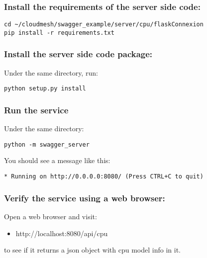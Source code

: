 \subsubsection{Install the requirements of the server side
code:}\label{install-the-requirements-of-the-server-side-code}

\begin{lstlisting}
cd ~/cloudmesh/swagger_example/server/cpu/flaskConnexion
pip install -r requirements.txt
\end{lstlisting}

\subsubsection{Install the server side code
package:}\label{install-the-server-side-code-package}

Under the same directory, run:

\begin{lstlisting}
python setup.py install
\end{lstlisting}

\subsubsection{Run the service}\label{run-the-service}

Under the same directory:

\begin{lstlisting}
python -m swagger_server
\end{lstlisting}

You should see a message like this:

\begin{lstlisting}
* Running on http://0.0.0.0:8080/ (Press CTRL+C to quit)
\end{lstlisting}

\subsubsection{Verify the service using a web
browser:}\label{verify-the-service-using-a-web-browser}

Open a web browser and visit:

\begin{itemize}

\item
  http://localhost:8080/api/cpu
\end{itemize}

to see if it returns a json object with cpu model info in it.

